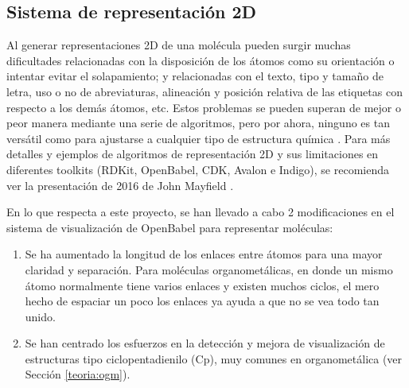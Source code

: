 \subsection{Sistema de representación 2D} \label{implementacion:dibujado}

Al generar representaciones 2D de una molécula pueden surgir muchas dificultades relacionadas con la disposición de los átomos como su orientación o intentar evitar el solapamiento; y relacionadas con el texto, tipo y tamaño de letra, uso o no de abreviaturas, alineación y posición relativa de las etiquetas con respecto a los demás átomos, etc. Estos problemas se pueden superan de mejor o peor manera mediante una serie de algoritmos, pero por ahora, ninguno es tan versátil como para ajustarse a cualquier tipo de estructura química \cite{david_molecular_2020}. Para más detalles y ejemplos de algoritmos de representación 2D y sus limitaciones en diferentes toolkits (RDKit, OpenBabel, CDK, Avalon e Indigo), se recomienda ver la presentación de 2016 de John Mayfield \cite{comparative_depictions}.

En lo que respecta a este proyecto, se han llevado a cabo 2 modificaciones en el sistema de visualización de OpenBabel para representar moléculas:
\begin{enumerate}
    \item Se ha aumentado la longitud de los enlaces entre átomos para una mayor claridad y separación. Para moléculas organometálicas, en donde un mismo átomo normalmente tiene varios enlaces y existen muchos ciclos, el mero hecho de espaciar un poco los enlaces ya ayuda a que no se vea todo tan unido.
    \item Se han centrado los esfuerzos en la detección y mejora de visualización de estructuras tipo ciclopentadienilo (Cp), muy comunes en organometálica (ver Sección \ref{teoria:ogm}).
\end{enumerate}


